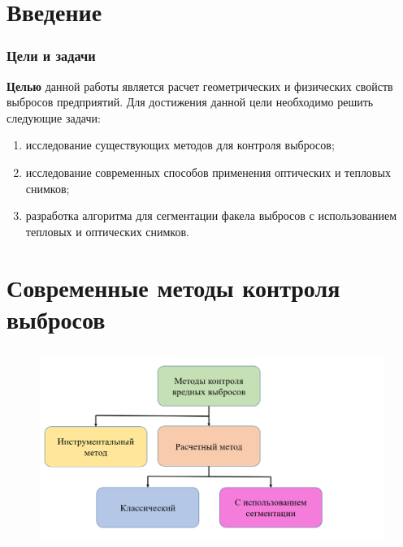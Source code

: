 \documentclass[t]{beamer}
\begin{document}
	
	\firstpage
	\justifying
\section{Введение}


	\begin{frame}
		\frametitle{Цели и задачи} 
		\textbf{Целью} данной работы является расчет геометрических и физических свойств выбросов предприятий. Для достижения данной цели необходимо решить следующие задачи:
		\begin{enumerate}
			\justifying
			\item исследование существующих методов для контроля выбросов;
			\item исследование современных способов применения оптических и тепловых снимков;
			\item разработка алгоритма для сегментации факела выбросов с использованием тепловых и оптических снимков.
		\end{enumerate}
	\end{frame}

\section[Современные методы]{Современные методы контроля выбросов}
	\begin{frame}
		\frametitle{\insertsection} 
		\begin{figure}
			\centering
			\includegraphics[width = \textwidth]{image/scheme1}	
		\end{figure}
	\end{frame}
\end{document}
